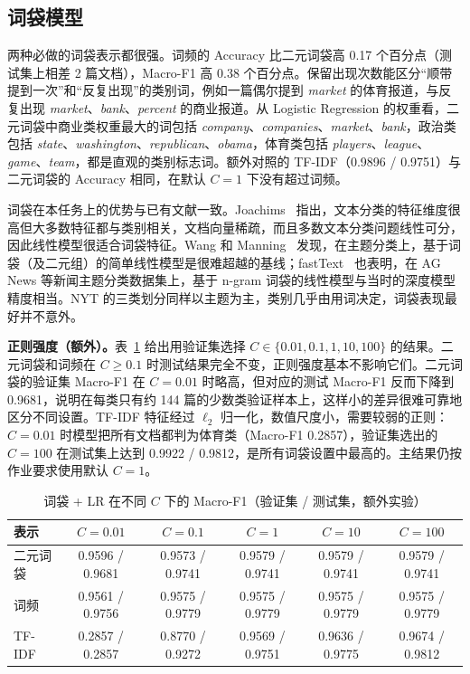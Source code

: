 \documentclass[lang=cn,a4paper]{elegantpaper}
\begin{document}
\subsection{词袋模型}
\label{sec:bow}

两种必做的词袋表示都很强。词频的 Accuracy 比二元词袋高 0.17 个百分点（测试集上相差 2 篇文档），Macro-F1 高 0.38 个百分点。保留出现次数能区分“顺带提到一次”和“反复出现”的类别词，例如一篇偶尔提到 \emph{market} 的体育报道，与反复出现 \emph{market}、\emph{bank}、\emph{percent} 的商业报道。从 Logistic Regression 的权重看，二元词袋中商业类权重最大的词包括 \emph{company}、\emph{companies}、\emph{market}、\emph{bank}，政治类包括 \emph{state}、\emph{washington}、\emph{republican}、\emph{obama}，体育类包括 \emph{players}、\emph{league}、\emph{game}、\emph{team}，都是直观的类别标志词。额外对照的 TF-IDF（0.9896 / 0.9751）与二元词袋的 Accuracy 相同，在默认 $C=1$ 下没有超过词频。

词袋在本任务上的优势与已有文献一致。Joachims~\cite{joachims1998text} 指出，文本分类的特征维度很高但大多数特征都与类别相关，文档向量稀疏，而且多数文本分类问题线性可分，因此线性模型很适合词袋特征。Wang 和 Manning~\cite{wang2012baselines} 发现，在主题分类上，基于词袋（及二元组）的简单线性模型是很难超越的基线；fastText~\cite{joulin2017bag} 也表明，在 AG News 等新闻主题分类数据集上，基于 n-gram 词袋的线性模型与当时的深度模型精度相当。NYT 的三类划分同样以主题为主，类别几乎由用词决定，词袋表现最好并不意外。

\textbf{正则强度（额外）。}表~\ref{tab:bow-c} 给出用验证集选择 $C\in\{0.01,0.1,1,10,100\}$ 的结果。二元词袋和词频在 $C\ge0.1$ 时测试结果完全不变，正则强度基本不影响它们。二元词袋的验证集 Macro-F1 在 $C=0.01$ 时略高，但对应的测试 Macro-F1 反而下降到 0.9681，说明在每类只有约 144 篇的少数类验证样本上，这样小的差异很难可靠地区分不同设置。TF-IDF 特征经过 $\ell_2$ 归一化，数值尺度小，需要较弱的正则：$C=0.01$ 时模型把所有文档都判为体育类（Macro-F1 0.2857），验证集选出的 $C=100$ 在测试集上达到 0.9922 / 0.9812，是所有词袋设置中最高的。主结果仍按作业要求使用默认 $C=1$。

\begin{table}[htbp]
  \centering
  \caption{词袋 + LR 在不同 $C$ 下的 Macro-F1（验证集 / 测试集，额外实验）}
  \label{tab:bow-c}
  \begin{tabular}{lccccc}
    \toprule
    表示 & $C=0.01$ & $C=0.1$ & $C=1$ & $C=10$ & $C=100$ \\
    \midrule
    二元词袋 & 0.9596 / 0.9681 & 0.9573 / 0.9741 & 0.9579 / 0.9741 & 0.9579 / 0.9741 & 0.9579 / 0.9741 \\
    词频 & 0.9561 / 0.9756 & 0.9575 / 0.9779 & 0.9575 / 0.9779 & 0.9575 / 0.9779 & 0.9575 / 0.9779 \\
    TF-IDF & 0.2857 / 0.2857 & 0.8770 / 0.9272 & 0.9569 / 0.9751 & 0.9636 / 0.9775 & 0.9674 / 0.9812 \\
    \bottomrule
  \end{tabular}
\end{table}
\end{document}

